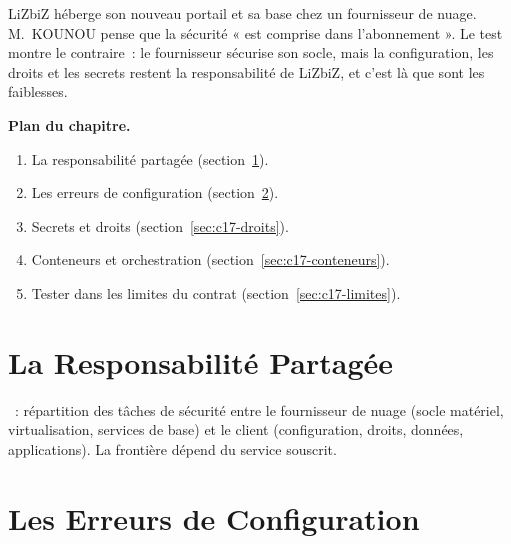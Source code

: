 LiZbiZ héberge son nouveau portail et sa base chez un fournisseur de nuage.
M.~KOUNOU pense que la sécurité « est comprise dans l'abonnement ». Le test
montre le contraire~: le fournisseur sécurise son socle, mais la
configuration, les droits et les secrets restent la responsabilité de
LiZbiZ, et c'est là que sont les faiblesses.

\medskip
\textbf{Plan du chapitre.}
\begin{enumerate}
    \item La responsabilité partagée (section~\ref{sec:c17-partage}).
    \item Les erreurs de configuration (section~\ref{sec:c17-config}).
    \item Secrets et droits (section~\ref{sec:c17-droits}).
    \item Conteneurs et orchestration (section~\ref{sec:c17-conteneurs}).
    \item Tester dans les limites du contrat (section~\ref{sec:c17-limites}).
\end{enumerate}

\separateur

\section{La Responsabilité Partagée}
\label{sec:c17-partage}

\begin{boxdef}
~: répartition des tâches de
sécurité entre le fournisseur de nuage (socle matériel, virtualisation,
services de base) et le client (configuration, droits, données,
applications). La frontière dépend du service souscrit.
\end{boxdef}

\section{Les Erreurs de Configuration}
\label{sec:c17-config}

